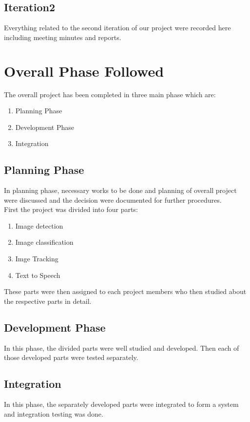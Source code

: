 		\subsection{Iteration2}
			Everything related to the second iteration of our project were recorded here including meeting minutes and reports.
	\section{Overall Phase Followed}
	The overall project has been completed in three main phase which are:
	\begin{enumerate}
		\item Planning Phase
		\item Development Phase
		\item Integration
	\end{enumerate}
	\subsection{Planning Phase}
	In planning phase, necessary works to be done and planning of overall project were discussed and the decision were documented for further procedures.\\
	First the project was divided into four parts:
	\begin{enumerate}
		\item Image detection
		\item Image classification
		\item Imge Tracking
		\item Text to Speech
	\end{enumerate}
	These parts were then assigned to each project members who then studied about the respective parts in detail.
	\subsection{Development Phase}
	In this phase, the divided parts were well studied and developed. Then each of those developed parts were tested separately.
	\subsection{Integration}
	In this phase, the separately developed parts were integrated to form a system and integration testing was done.\pagebreak
